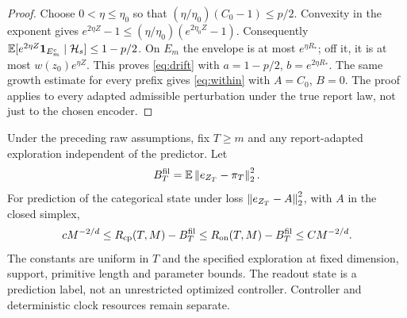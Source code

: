 \begin{proof}
Choose $0<\eta\le\eta_0$ so that $(\eta/\eta_0)(C_0-1)\le p/2$. Convexity in the exponent gives
$e^{2\eta Z}-1\le(\eta/\eta_0)(e^{2\eta_0Z}-1)$.
Consequently $\mathbb E[e^{2\eta Z}\mathbf 1_{E_m^c}\mid\mathcal H_s]\le1-p/2$. On $E_m$ the envelope is at most $e^{\eta R_*}$; off it, it is at most $w(z_0)e^{\eta Z}$. This proves \eqref{eq:drift} with $a=1-p/2$, $b=e^{2\eta R_*}$. The same growth estimate for every prefix gives \eqref{eq:within} with $A=C_0$, $B=0$. The proof applies to every adapted admissible perturbation under the true report law, not just to the chosen encoder.
\end{proof}

\begin{theorem}\label{thm:brier}
Under the preceding raw assumptions, fix $T\ge m$ and any report-adapted exploration independent of the predictor. Let
\[
 B_T^{\rm fil}=\mathbb E\left\lVert e_{Z_T}-\pi_T\right\rVert_2^2.
\]
For prediction of the categorical state under loss $\left\lVert e_{Z_T}-A\right\rVert^2_2$, with $A$ in the closed simplex,
\begin{equation}\label{eq:brier}
 cM^{-2/d}\le R_{\mathrm{cp}}(T,M)-B_T^{\rm fil}
 \le R_{\mathrm{on}}(T,M)-B_T^{\rm fil}\le CM^{-2/d}.
\end{equation}
The constants are uniform in $T$ and the specified exploration at fixed dimension, support, primitive length and parameter bounds. The readout state is a prediction label, not an unrestricted optimized controller. Controller and deterministic clock resources remain separate.
\end{theorem}
